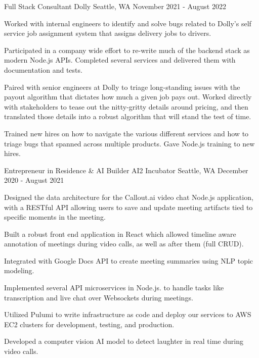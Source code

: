 \begin{cventries}
  \cventry
    {Full Stack Consultant} %
    {Dolly} %
    {Seattle, WA} %
    {November 2021 - August 2022} %
    {
      \begin{cvitems} %
        \item {Worked with internal engineers to identify and solve bugs related to Dolly's self service job assignment system that assigns delivery jobs to drivers.}
        \item {Participated in a company wide effort to re-write much of the backend stack as modern Node.js APIs. Completed several services and delivered them with documentation and tests.}
        \item {Paired with senior engineers at Dolly to triage long-standing issues with the payout algorithm that dictates how much a given job pays out. Worked directly with stakeholders to tease out the nitty-gritty details around pricing, and then translated those details into a robust algorithm that will stand the test of time.}
        \item {Trained new hires on how to navigate the various different services and how to triage bugs that spanned across multiple products. Gave Node.js training to new hires.}
      \end{cvitems}
    }

  \cventry
    {Entrepreneur in Residence \& AI Builder} %
    {AI2 Incubator} %
    {Seattle, WA} %
    {December 2020 - August 2021} %
    {
      \begin{cvitems} %
        \item {Designed the data architecture for the Callout.ai video chat Node.js application, with a RESTful API allowing users to save and update meeting artifacts tied to specific moments in the meeting.}
        \item {Built a robust front end application in React which allowed timeline aware annotation of meetings during video calls, as well as after them (full CRUD).}
        \item {Integrated with Google Docs API to create meeting summaries using NLP topic modeling.}
        \item {Implemented several API microservices in Node.js. to handle tasks like transcription and live chat over Websockets during meetings.}
        \item {Utilized Pulumi to write infrastructure as code and deploy our services to AWS EC2 clusters for development, testing, and production.}
        \item {Developed a computer vision AI model to detect laughter in real time during video calls.}
      \end{cvitems}
    }


\end{cventries}
